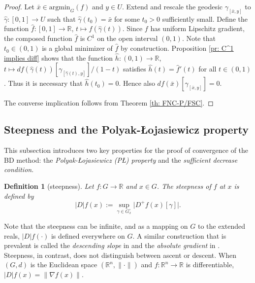 \documentclass{article}
\theoremstyle{plain}\newtheorem{theorem}{Theorem}[section]
\theoremstyle{plain}\newtheorem{definition}[theorem]{Definition}
\theoremstyle{plain}\newtheorem{lemma}[theorem]{Lemma}
\theoremstyle{definition}\newtheorem{remark}[theorem]{Remark}
\theoremstyle{definition}\newtheorem{example}[theorem]{Example}
\theoremstyle{plain}\newtheorem{proposition}[theorem]{Proposition}
\theoremstyle{plain}\newtheorem{inference}[theorem]{Inference}
\theoremstyle{plain}\newtheorem{corollary}[theorem]{Corollary}
\theoremstyle{plain}\newtheorem{assumption}[theorem]{Assumption}
\newcommand{\xbar}{\bar{x}}
\newcommand{\bbR}{\mathbb{R}}
\begin{document}
\begin{proof}
    Let $\xbar\in\mathrm{argmin}_G(f)$ and $y\in U$. Extend and rescale the geodesic $\gamma_{[\xbar,y]}$ to $\widehat{\gamma}:[0,1]\to U$ such that $\widehat{\gamma}(t_0)=\xbar$ for some $t_0>0$ sufficiently small. Define the function $\widehat{f}:[0,1]\to\mathbb{R}$, $t\mapsto f(\widehat{\gamma}(t))$. Since $f$ has uniform Lipschitz gradient, the composed function $\widehat{f}$ is $C^1$ on the open interval $(0,1)$. Note that $t_0\in(0,1)$ is a global minimizer of $\widehat{f}$ by construction. Proposition \ref{pr: C^1 implies diff} shows that the function $\widehat{h}:(0,1)\to\mathbb{R}$, $t\mapsto df(\widehat{\gamma}(t))[\gamma_{[\widehat{\gamma}(t),y]}]/(1-t)$ satisfies $\widehat{h}(t)=\widehat{f}'(t)$ for all $t\in(0,1)$. Thus it is necessary that $\widehat{h}(t_0)=0$. Hence also $df(\xbar)[\gamma_{[\xbar,y]}]=0$.

    The converse implication follows from Theorem \ref{th: FNC-P/FSC}.
\end{proof}
\subsection{Steepness and the Polyak-Łojasiewicz property}\label{s:max slope PL}
This subsection introduces two key properties for the proof of convergence of the BD method: the {\em Polyak-Łojasiewicz (PŁ) property} and the {\em sufficient decrease condition}.
\begin{definition}[steepness]\label{d:steepness}
    Let $f:G\to\bbR$ and $x\in G$. The {\em steepness} of $f$ at $x$ is defined by
    $$
    |D|f(x):=\sup_{\gamma\in G_x^{\circ}}\bigl|D^+f(x)[\gamma]\bigr|.
    $$
\end{definition}
Note that the steepness can be infinite, and as a mapping on $G$ to the extended reals, $|D|f(\cdot)$ is defined everywhere on $G$. A similar construction that is prevalent is called the {\em descending slope} in \cite[Definition 1.1]{DeGMarTos80} and the {\em absolute gradient} in \cite[Definition 3.1]{OhtaPal15}.  Steepness, in contrast, does not distinguish between ascent or descent. When $(G,d)$ is the Euclidean space $(\mathbb{R}^n,\|\cdot\|)$ and $f:\mathbb{R}^n\to\mathbb{R}$ is differentiable, $|D|f(x)=\|\nabla f(x)\|$.
\end{document}
